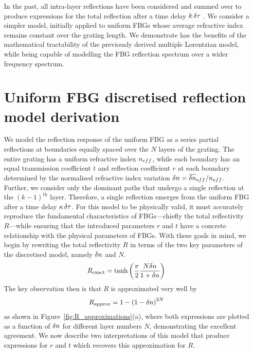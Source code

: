 %
\par
%
In the past, all intra-layer reflections have been considered and summed over to produce expressions for the total reflection after a time delay $k \, \delta \tau$ \cite{ghiringhelli2002time}. We consider a simpler model, initially applied to uniform FBGs whose average refractive index remains constant over the grating length. We demonstrate has the benefits of the mathematical tractability of the previously derived multiple Lorentzian model, while being capable of modelling the FBG reflection spectrum over a wider frequency spectrum. 
%
%
\section{Uniform FBG discretised reflection model derivation}
\label{sec:FBG_discretised_derivation}
%
We model the reflection response of the uniform FBG as a series partial reflections at boundaries equally spaced over the $N$ layers of the grating. The entire grating has a uniform refractive index $n_{eff}$, while each boundary has an equal transmission coefficient $t$ and reflection coefficient $r$ at each boundary determined by the normalised refractive index variation $\delta n = \overline{\delta n}_{eff}/n_{eff}$. Further, we consider only the dominant paths that undergo a single reflection at the $(k-1)^\text{th}$ layer. Therefore, a single reflection emerges from the uniform FBG after a time delay $\kappa \, \delta \tau$. For this model to be physically valid, it must accurately reproduce the fundamental characteristics of FBGs—chiefly the total reflectivity $R$—while ensuring that the introduced parameters $r$ and $t$ have a concrete relationship with the physical parameters of FBGs. With these goals in mind, we begin by rewriting the total reflectivity $R$ in terms of the two key parameters of the discretised model, namely $\delta n$ and $N$.
%
\begin{equation}
\label{eq:R_exact}
    R_\text{exact} = \tanh{\left(\frac{\pi}{2}\frac{N \delta n}{1+\delta n} \right) }
\end{equation}
%
The key observation then is that $R$ is approximated very well by
%
\begin{equation}
    \label{eq:R_approx}
    R_\text{approx} = 1 - \left( 1 - \delta n\right)^{2N}
\end{equation}
%
as shown in Figure~\ref{fig:R_approximations}(a), where both expressions are plotted as a function of $\delta n$ for different layer numbers $N$, demonstrating the excellent agreement. We now describe two interpretations of this model that produce expressions for $r$ and $t$ which recovers this approximation for $R$. 
